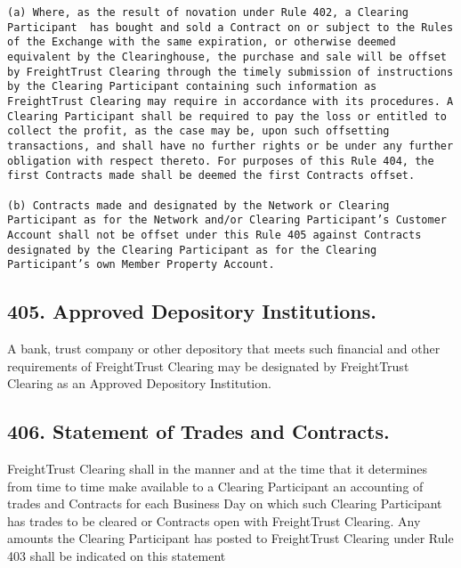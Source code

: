 \documentclass[12pt]{article}
\begin{document}
\begin{verbatim}
(a) Where, as the result of novation under Rule 402, a Clearing Participant  has bought and sold a Contract on or subject to the Rules of the Exchange with the same expiration, or otherwise deemed equivalent by the Clearinghouse, the purchase and sale will be offset by FreightTrust Clearing through the timely submission of instructions by the Clearing Participant containing such information as FreightTrust Clearing may require in accordance with its procedures. A Clearing Participant shall be required to pay the loss or entitled to collect the profit, as the case may be, upon such offsetting transactions, and shall have no further rights or be under any further obligation with respect thereto. For purposes of this Rule 404, the first Contracts made shall be deemed the first Contracts offset.

(b) Contracts made and designated by the Network or Clearing Participant as for the Network and/or Clearing Participant’s Customer Account shall not be offset under this Rule 405 against Contracts designated by the Clearing Participant as for the Clearing Participant’s own Member Property Account.
\end{verbatim}

\hypertarget{approved-depository-institutions.}{%
\subsection{405. Approved Depository
Institutions.}\label{approved-depository-institutions.}}

A bank, trust company or other depository that meets such financial and
other requirements of FreightTrust Clearing may be designated by
FreightTrust Clearing as an Approved Depository Institution.

\hypertarget{statement-of-trades-and-contracts.}{%
\subsection{406. Statement of Trades and
Contracts.}\label{statement-of-trades-and-contracts.}}

FreightTrust Clearing shall in the manner and at the time that it
determines from time to time make available to a Clearing Participant an
accounting of trades and Contracts for each Business Day on which such
Clearing Participant has trades to be cleared or Contracts open with
FreightTrust Clearing. Any amounts the Clearing Participant has posted
to FreightTrust Clearing under Rule 403 shall be indicated on this
statement
\end{document}

